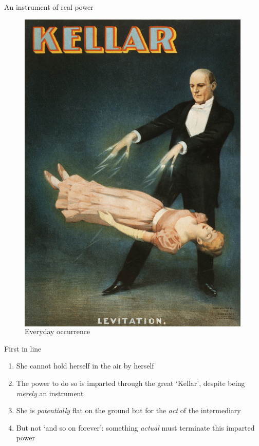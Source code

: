 \documentclass[xcolor=dvipsnames]{beamer}
\begin{document}
\begin{frame}{An instrument of real power}
\begin{figure}
\begin{columns}
    \centering
    \caption {Everyday occurrence}
    \includegraphics[width=0.99\textwidth]{levitation}
  \end{columns}
\end{figure}
\end{frame}


\begin{frame}[fragile]{First in line}
  \begin{enumerate}
  \item She cannot hold herself in the air by herself \vspace{5mm}
  \item The power to do so is imparted through the great `Kellar', despite being \emph{merely} an instrument \vspace{5mm}
  \item She is \emph{potentially} flat on the ground but for the \emph{act} of the intermediary \vspace{5mm}
  \item But not `and so on forever': something \emph{actual} must terminate this imparted power \vspace{5mm}
  \end{enumerate}
\end{frame}
\end{document}
